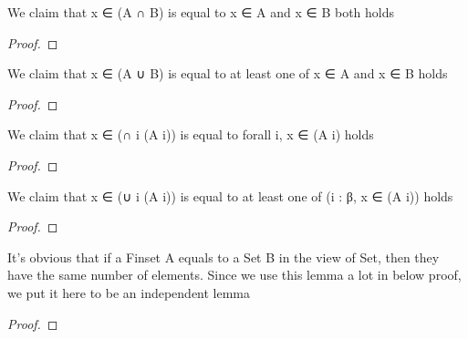 \begin{lemma}\label{char_fun_inter}
        \leanok
                We claim that x ∈ (A ∩ B) is equal to x ∈ A and x ∈ B both holds
    \end{lemma}

\begin{proof}
    \leanok
\end{proof}

\begin{lemma}\label{char_fun_union}
        \leanok
                We claim that x ∈ (A ∪ B) is equal to at least one of x ∈ A and x ∈ B holds
    \end{lemma}

\begin{proof}
    \leanok
\end{proof}

\begin{lemma}\label{char_fun_FinInter}
        \leanok
                We claim that x ∈ (∩ i (A i)) is equal to forall i, x ∈ (A i) holds
    \end{lemma}

\begin{proof}
    \leanok
\end{proof}

\begin{lemma}\label{char_fun_FinUnion}
        \leanok
                We claim that x ∈ (∪ i (A i)) is equal to at least one of (i : β, x ∈ (A i)) holds
    \end{lemma}

\begin{proof}
    \leanok
\end{proof}

\begin{lemma}\label{card_eq}
        \leanok
                It's obvious that if a Finset A equals to a Set B in the view of Set, then they have the same number of elements. Since we use this lemma a lot in below proof, we put it here to be an independent lemma
    \end{lemma}

\begin{proof}
    \leanok
\end{proof}

